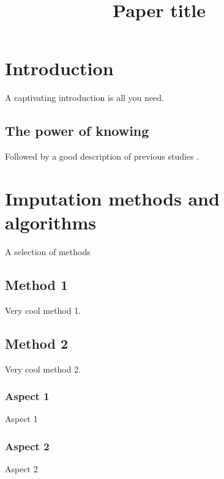\documentclass[a4paper,man,floatsintext,natbib]{apa6}\usepackage[]{graphicx}\usepackage[]{xcolor}
\title{Paper title}
\begin{document}
	\maketitle

    \linenumbers

    \setcounter{secnumdepth}{3} %

    
\section{Introduction}

    A captivating introduction is all you need.

\subsection{The power of knowing}

    Followed by a good description of previous studies \citep{collinsEtAl:2001}.
    
\section{Imputation methods and algorithms}\label{sec:methods}

	A selection of methods

\subsection{Method 1}

	Very cool method 1.

\subsection{Method 2}

	Very cool method 2.

\subsubsection{Aspect 1}

	Aspect 1

\subsubsection{Aspect 2}

	Aspect 2
    
\end{document}
